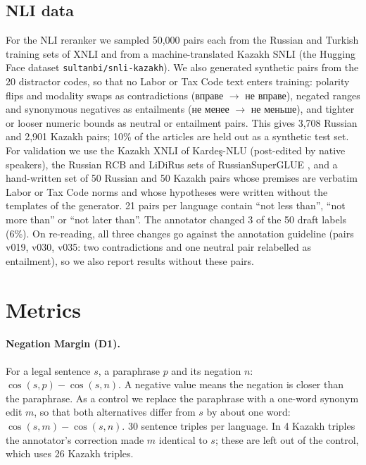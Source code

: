 \documentclass[11pt]{article}
\newcommand{\ru}[1]{#1}
\begin{document}
\subsection{NLI data}
For the NLI reranker we sampled 50,000 pairs each from the Russian and Turkish training sets of XNLI
\citep{conneau-etal-2018-xnli} and from a machine-translated Kazakh SNLI \citep{bowman-etal-2015-large}
(the Hugging Face dataset \texttt{sultanbi/snli-kazakh}). We also generated synthetic pairs from the 20 distractor codes, so
that no Labor or Tax Code text enters training: polarity flips and modality swaps as contradictions
(\ru{вправе} $\rightarrow$ \ru{не вправе}), negated ranges and synonymous negatives as entailments
(\ru{не менее} $\rightarrow$ \ru{не меньше}), and tighter or looser numeric bounds as neutral or entailment
pairs. This gives 3,708 Russian and 2,901 Kazakh pairs; 10\% of the articles are held out as a synthetic test
set. For validation we use the Kazakh XNLI of Karde\c{s}-NLU \citep{senel-etal-2024-kardes} (post-edited by native
speakers), the Russian RCB and LiDiRus sets of RussianSuperGLUE \citep{shavrina-etal-2020-russiansuperglue}, and a hand-written set of 50 Russian and 50 Kazakh pairs whose premises are verbatim
Labor or Tax Code norms and whose hypotheses were written without the templates of the generator. 21 pairs per
language contain ``not less than'', ``not more than'' or ``not later than''. The annotator changed 3 of the 50
draft labels (6\%). On re-reading, all three changes go against the annotation guideline (pairs v019, v030,
v035: two contradictions and one neutral pair relabelled as entailment), so we also report results without
these pairs.

\section{Metrics}

\paragraph{Negation Margin (D1).} For a legal sentence $s$, a paraphrase $p$ and its negation $n$:
$\cos(s,p) - \cos(s,n)$. A negative value means the negation is closer than the paraphrase. As a control we
replace the paraphrase with a one-word synonym edit $m$, so that both alternatives differ from $s$ by about
one word: $\cos(s,m) - \cos(s,n)$. 30 sentence triples per language. In 4 Kazakh triples the annotator's
correction made $m$ identical to $s$; these are left out of the control, which uses 26 Kazakh triples.
\end{document}
